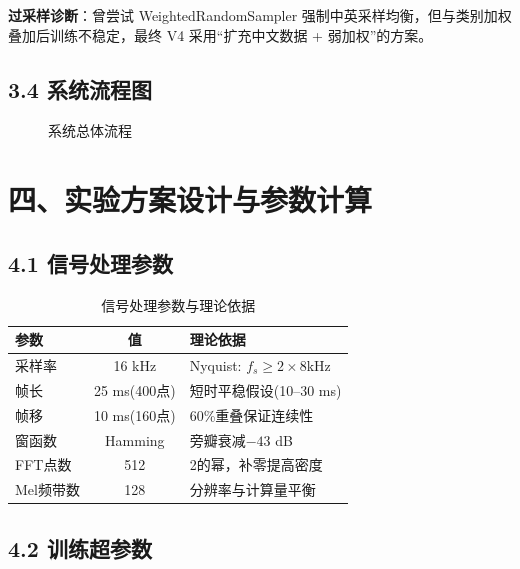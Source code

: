 ﻿\documentclass[12pt,a4paper]{article}
\begin{document}
\textbf{过采样诊断}：曾尝试 WeightedRandomSampler 强制中英采样均衡，但与类别加权叠加后训练不稳定，最终 V4 采用“扩充中文数据 + 弱加权”的方案。

\subsection*{3.4 系统流程图}

\begin{figure}[H]\centering
{}
\caption{系统总体流程}\label{fig:flow}
\end{figure}

\section*{四、实验方案设计与参数计算}

\subsection*{4.1 信号处理参数}

\begin{table}[H]\centering\caption{信号处理参数与理论依据}
\begin{tabular}{l|c|l}\toprule
\textbf{参数}&\textbf{值}&\textbf{理论依据}\\\midrule
采样率&16 kHz&Nyquist: $f_s\ge2\times8$kHz\\
帧长&25 ms(400点)&短时平稳假设(10--30 ms)\\
帧移&10 ms(160点)&60\%重叠保证连续性\\
窗函数&Hamming&旁瓣衰减$-43$ dB\\
FFT点数&512&2的幂，补零提高密度\\
Mel频带数&128&分辨率与计算量平衡\\\bottomrule
\end{tabular}
\end{table}

\subsection*{4.2 训练超参数}
\end{document}
